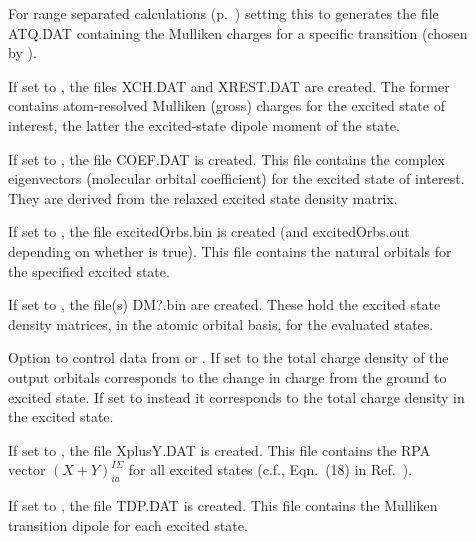 \begin{description}
  \item[] For range separated calculations
    (p.~) setting this to  generates the file
    ATQ.DAT containing the Mulliken charges for a specific transition (chosen by
    ).

  \item[] If set to , the files XCH.DAT and XREST.DAT
    are created. The former contains atom-resolved Mulliken (gross) charges for
    the excited state of interest, the latter the excited-state dipole moment of
    the state.

  \item[] If set to , the file COEF.DAT is
    created. This file contains the complex eigenvectors (molecular orbital
    coefficient) for the excited state of interest. They are derived from the
    relaxed excited state density matrix.

  \item[] If set to , the file excitedOrbs.bin is
    created (and excitedOrbs.out depending on whether  is
    true). This file contains the natural orbitals for the specified excited
    state.

  \item[] If set to , the file(s) DM?.bin are
    created. These hold the excited state density matrices, in the atomic
    orbital basis, for the evaluated states.

  \item[] Option to control data from
     or . If set to  the
    total charge density of the output orbitals corresponds to the change in
    charge from the ground to excited state. If set to  instead it
    corresponds to the total charge density in the excited state.

  \item[] If set to , the file XplusY.DAT is
    created. This file contains the RPA vector $(X+Y)^{I\Sigma}_{ia}$ for all
    excited states (c.f., Eqn.~(18) in Ref.~\cite{heringer2007aes}).

  \item[] If set to , the file TDP.DAT is
    created. This file contains the Mulliken transition dipole for each excited
    state.


\end{description}

